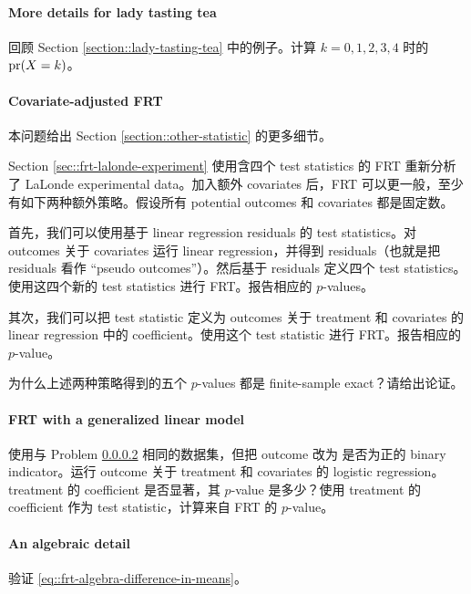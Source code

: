 \paragraph{More details for lady tasting tea}
\label{hw::more-tea}

回顾 Section \ref{section::lady-tasting-tea} 中的例子。计算 $k=0,1,2,3,4$ 时的 $\textup{pr}(X=k)$。


\paragraph{Covariate-adjusted FRT}
\label{hw::frt-covariates}


本问题给出 Section \ref{section::other-statistic} 的更多细节。


Section \ref{sec::frt-lalonde-experiment} 使用含四个 test statistics 的 FRT 重新分析了 LaLonde experimental data。加入额外 covariates 后，FRT 可以更一般，至少有如下两种额外策略。假设所有 potential outcomes 和 covariates 都是固定数。

首先，我们可以使用基于 linear regression residuals 的 test statistics。对 outcomes 关于 covariates 运行 linear regression，并得到 residuals（也就是把 residuals 看作 ``pseudo outcomes''）。然后基于 residuals 定义四个 test statistics。使用这四个新的 test statistics 进行 FRT。报告相应的 $p$-values。


其次，我们可以把 test statistic 定义为 outcomes 关于 treatment 和 covariates 的 linear regression 中的 coefficient。使用这个 test statistic 进行 FRT。报告相应的 $p$-value。


为什么上述两种策略得到的五个 $p$-values 都是 finite-sample exact？请给出论证。



\paragraph{FRT with a generalized linear model}
\label{hw::frt-glm}


使用与 Problem \ref{hw::frt-covariates} 相同的数据集，但把 outcome 改为  是否为正的 binary indicator。运行 outcome 关于 treatment 和 covariates 的 logistic regression。treatment 的 coefficient 是否显著，其 $p$-value 是多少？使用 treatment 的 coefficient 作为 test statistic，计算来自 FRT 的 $p$-value。




\paragraph{An algebraic detail}
\label{hw::frt-algebraic-detail}

验证 \eqref{eq::frt-algebra-difference-in-means}。
